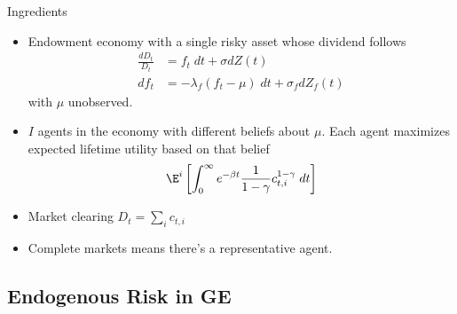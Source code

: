 \documentclass[12pt]{article}
\theoremstyle{plain}
\theoremstyle{definition}
\theoremstyle{remark}
\begin{document}
Ingredients
\begin{itemize}
  \item
    Endowment economy with a single risky asset whose dividend follows
    \begin{align*}
      \frac{dD_t}{D_t}
      &= f_t\;dt +\sigma dZ(t)\\
      df_t
      &= -\lambda_f(f_t-\mu)\;dt + \sigma_fdZ_f(t)
    \end{align*}
    with $\mu$ unobserved.

  \item
    $I$ agents in the economy with different beliefs about $\mu$.
    Each agent maximizes expected lifetime utility based on that belief
    \begin{align*}
      \E^i\left[
        \int_0^\infty
        e^{-\beta t}
        \frac{1}{1-\gamma}
        c_{t,i}^{1-\gamma}
        \;dt
      \right]
    \end{align*}
  \item
    Market clearing $D_t=\sum_i c_{t,i}$

  \item
    Complete markets means there's a representative agent.


\end{itemize}





\subsection{Endogenous Risk in GE}
\end{document}
